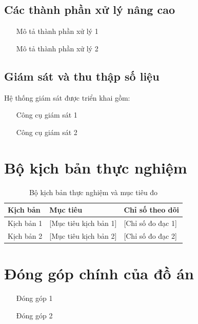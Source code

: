 \subsection{Các thành phần xử lý nâng cao}
\begin{itemize}
    \item [Mô tả thành phần xử lý 1]
    \item [Mô tả thành phần xử lý 2]
\end{itemize}

\subsection{Giám sát và thu thập số liệu}
Hệ thống giám sát được triển khai gồm:
\begin{itemize}
    \item [Công cụ giám sát 1]
    \item [Công cụ giám sát 2]
\end{itemize}

\section{Bộ kịch bản thực nghiệm}

\begin{table}[htbp]
    \centering
    \caption{Bộ kịch bản thực nghiệm và mục tiêu đo}
    \label{tab:chapter2-final-scenarios}
    \small
    \begin{tabularx}{\textwidth}{@{} l X X @{} }
        \toprule
        \textbf{Kịch bản} & \textbf{Mục tiêu} & \textbf{Chỉ số theo dõi} \\
        \midrule
        Kịch bản 1 & [Mục tiêu kịch bản 1] & [Chỉ số đo đạc 1] \\
        Kịch bản 2 & [Mục tiêu kịch bản 2] & [Chỉ số đo đạc 2] \\
        \bottomrule
    \end{tabularx}
\end{table}

\section{Đóng góp chính của đồ án}

\begin{itemize}
    \item [Đóng góp 1]
    \item [Đóng góp 2]
\end{itemize}


